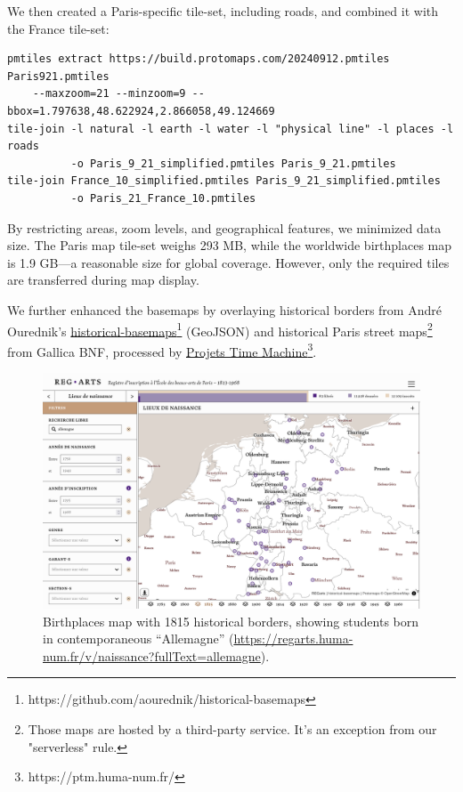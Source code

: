 \documentclass[final]{anthology-ch} %
\begin{document}
We then created a Paris-specific tile-set, including roads, and combined it with the France tile-set:
\begin{verbatim}
pmtiles extract https://build.protomaps.com/20240912.pmtiles Paris921.pmtiles
    --maxzoom=21 --minzoom=9 --bbox=1.797638,48.622924,2.866058,49.124669
tile-join -l natural -l earth -l water -l "physical line" -l places -l roads
          -o Paris_9_21_simplified.pmtiles Paris_9_21.pmtiles
tile-join France_10_simplified.pmtiles Paris_9_21_simplified.pmtiles
          -o Paris_21_France_10.pmtiles
\end{verbatim}
By restricting areas, zoom levels, and geographical features, we minimized data size. The Paris map tile-set weighs 293 MB, while the worldwide birthplaces map is 1.9 GB—a reasonable size for global coverage. However, only the required tiles are transferred during map display.

We further enhanced the basemaps by overlaying historical borders from André Ourednik’s \href{https://github.com/aourednik/historical-basemaps}{historical-basemaps}\footnote{https://github.com/aourednik/historical-basemaps} (GeoJSON) and historical Paris street maps\footnote{Those maps are hosted by a third-party service. It's an exception from our "serverless" rule.} from Gallica BNF, processed by \href{https://ptm.huma-num.fr/}{Projets Time Machine}\footnote{https://ptm.huma-num.fr/}.



\begin{figure}[t!]
  \centering
  \includegraphics[width=1\linewidth]{figures/brithplaces_map.png}
  \caption{Birthplaces map with 1815 historical borders, showing students born in contemporaneous “Allemagne” (\href{https://regarts.huma-num.fr/v/naissance?fullText=allemagne}{https://regarts.huma-num.fr/v/naissance?fullText=allemagne}).}
  \label{fig:birthplaces_map}
\end{figure}
\end{document}
